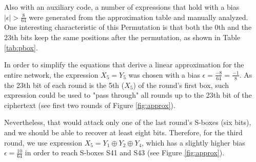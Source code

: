 \documentclass[11pt]{article}
\begin{document}
Also with an auxiliary code, a number of expressions that hold with a bias $|\epsilon| > \frac{8}{64}$ were generated from the approximation table and manually analyzed. One interesting characteristic of this Permutation is that both the 0th and the 23th bits keep the same positions after the permutation, as shown in Table \ref{tab:pbox}.

In order to simplify the equations that derive a linear approximation for the entire network, the expression $X_5 = Y_5$  was chosen with a bias $\epsilon = \frac{-8}{64} = \frac{-1}{8}$. As the 23th bit of each round is the 5th ($X_5$) of the round's first box, such expression could be used to "pass through" all rounds up to the 23th bit of the ciphertext (see first two rounds of Figure \ref{fig:approx}).

Nevertheless, that would attack only one of the last round's S-boxes (six bits), and we should be able to recover at least eight bits. Therefore, for the third round, we use expression $X_5 = Y_1 \oplus Y_2 \oplus Y_4$, which has a slightly higher bias $\epsilon = \frac{10}{64}$ in order to reach S-boxes S41 and S43 (see Figure \ref{fig:approx}).
\end{document}
